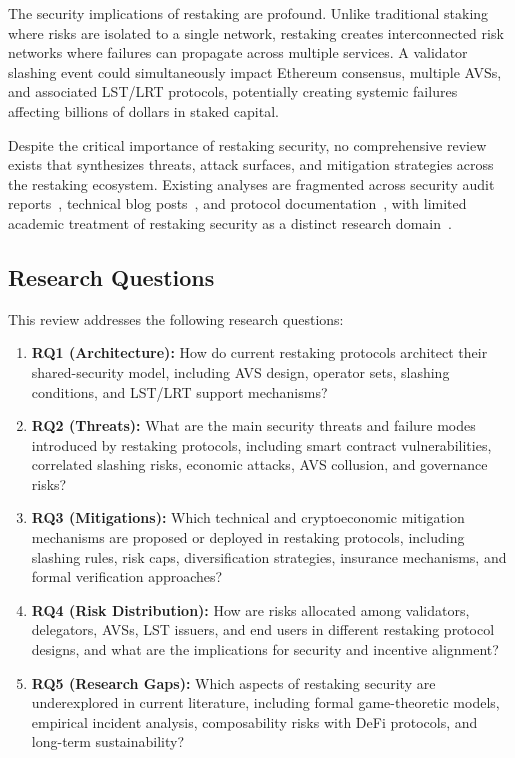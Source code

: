 \documentclass[runningheads]{llncs}
\begin{document}
The security implications of restaking are profound. Unlike traditional staking where risks are isolated to a single network, restaking creates interconnected risk networks where failures can propagate across multiple services. A validator slashing event could simultaneously impact Ethereum consensus, multiple AVSs, and associated LST/LRT protocols, potentially creating systemic failures affecting billions of dollars in staked capital.

Despite the critical importance of restaking security, no comprehensive review exists that synthesizes threats, attack surfaces, and mitigation strategies across the restaking ecosystem. Existing analyses are fragmented across security audit reports~\cite{certora2025,code4rena2023,trailofbits2024,openzeppelin2024}, technical blog posts~\cite{blocksec2024,sigmaprime2024,cobo2024,okx2024}, and protocol documentation~\cite{eigenlayerwhitepaper2023,symbioticwhitepaper2024}, with limited academic treatment of restaking security as a distinct research domain~\cite{durvasula2024robust,zhang2024proof,li2024mitigating}.

\subsection{Research Questions}

This review addresses the following research questions:

\begin{enumerate}
    \item \textbf{RQ1 (Architecture):} How do current restaking protocols architect their shared-security model, including AVS design, operator sets, slashing conditions, and LST/LRT support mechanisms?
    
    \item \textbf{RQ2 (Threats):} What are the main security threats and failure modes introduced by restaking protocols, including smart contract vulnerabilities, correlated slashing risks, economic attacks, AVS collusion, and governance risks?
    
    \item \textbf{RQ3 (Mitigations):} Which technical and cryptoeconomic mitigation mechanisms are proposed or deployed in restaking protocols, including slashing rules, risk caps, diversification strategies, insurance mechanisms, and formal verification approaches?
    
    \item \textbf{RQ4 (Risk Distribution):} How are risks allocated among validators, delegators, AVSs, LST issuers, and end users in different restaking protocol designs, and what are the implications for security and incentive alignment?
    
    \item \textbf{RQ5 (Research Gaps):} Which aspects of restaking security are underexplored in current literature, including formal game-theoretic models, empirical incident analysis, composability risks with DeFi protocols, and long-term sustainability?
\end{enumerate}
\end{document}
